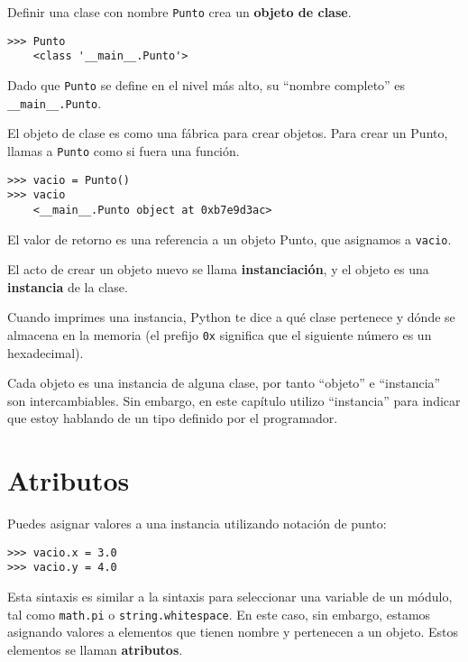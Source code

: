 \documentclass[10pt]{book}
\begin{document}
Definir una clase con nombre {\tt Punto} crea un {\bf objeto de clase}.

\begin{verbatim}
>>> Punto
    <class '__main__.Punto'>
\end{verbatim}
%
Dado que {\tt Punto} se define en el nivel más alto, su ``nombre
completo'' es \verb"__main__.Punto".

El objeto de clase es como una fábrica para crear objetos.  Para crear un
Punto, llamas a {\tt Punto} como si fuera una función.

\begin{verbatim}
>>> vacio = Punto()
>>> vacio
    <__main__.Punto object at 0xb7e9d3ac>
\end{verbatim}
%
El valor de retorno es una referencia a un objeto Punto, que
asignamos a {\tt vacio}.

El acto de crear un objeto nuevo se llama
{\bf instanciación}, y el objeto es una {\bf instancia} de
la clase.

Cuando imprimes una instancia, Python te dice a qué clase
pertenece y dónde se almacena en la memoria (el prefijo
{\tt 0x} significa que el siguiente número es un hexadecimal).

Cada objeto es una instancia de alguna clase, por tanto ``objeto'' e
``instancia'' son intercambiables.  Sin embargo, en este capítulo utilizo
``instancia'' para indicar que estoy hablando de un tipo definido por el
programador.


\section{Atributos}
\label{attributes}

Puedes asignar valores a una instancia utilizando notación de punto:

\begin{verbatim}
>>> vacio.x = 3.0
>>> vacio.y = 4.0
\end{verbatim}
%
Esta sintaxis es similar a la sintaxis para seleccionar una variable de un
módulo, tal como {\tt math.pi} o {\tt string.whitespace}.  En este caso,
sin embargo, estamos asignando valores a elementos que tienen nombre y pertenecen a un objeto.
Estos elementos se llaman {\bf atributos}.

\end{document}

